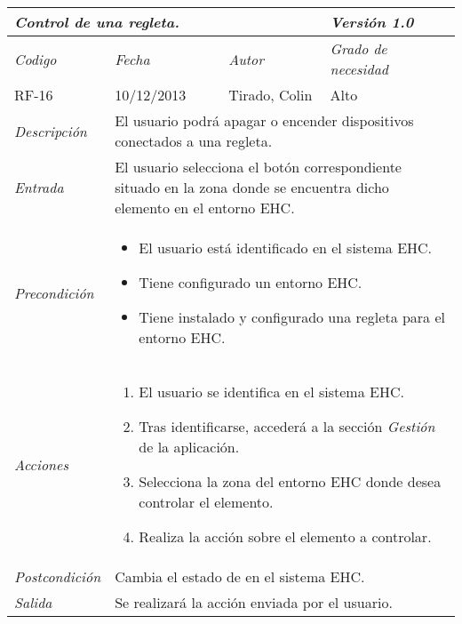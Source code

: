 \begin{center}
    \begin{tabular}{|p{3cm}|p{4cm}|p{4cm}|p{4cm}|}
    \hline \multicolumn{3}{|p{9cm}|}{\textit{Control de una regleta.}} & \textit{Versi\'on 1.0} \\
    \hline \textit{Codigo} & \textit{Fecha} & \textit{Autor} & \textit{Grado de necesidad} \\
    RF-16 & 10/12/2013 & Tirado, Colin & Alto \\
    \hline \textit{Descripci\'on} & \multicolumn{3}{|p{9cm}|}{El usuario podr\'a apagar o encender dispositivos conectados a una regleta.} \\
    \hline \textit{Entrada} & \multicolumn{3}{|p{9cm}|}{El usuario selecciona el bot\'on correspondiente situado en la zona donde se encuentra dicho elemento en el entorno EHC.} \\
    \hline \textit{Precondici\'on} & \multicolumn{3}{|p{9cm}|}{
    \begin{itemize}
    \item El usuario est\'a identificado en el sistema EHC.
    \item Tiene configurado un entorno EHC.
    \item Tiene instalado y configurado una regleta para el entorno EHC.
    \end{itemize}
    } \\
    \hline \textit{Acciones} & \multicolumn{3}{|p{9cm}|}{
    \begin{enumerate}
    \item El usuario se identifica en el sistema EHC.
    \item Tras identificarse, acceder\'a a la secci\'on \textit{Gesti\'on} de la aplicaci\'on.
    \item Selecciona la zona del entorno EHC donde desea controlar el elemento.
    \item Realiza la acci\'on sobre el elemento a controlar.
    \end{enumerate}
    } \\
    \hline \textit{Postcondici\'on} & \multicolumn{3}{|p{9cm}|}{Cambia el estado de  en el sistema EHC.} \\
    \hline \textit{Salida} & \multicolumn{3}{|p{9cm}|}{Se realizar\'a la acci\'on enviada por el usuario.} \\ \hline
    \end{tabular}
\end{center}
